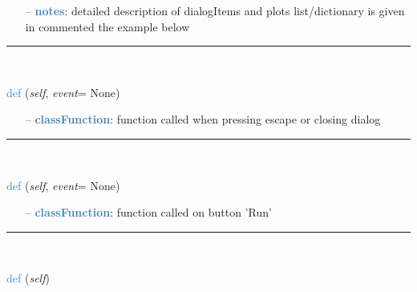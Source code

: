 \begin{itemize}[leftmargin=1.4cm]
\begin{itemize}[leftmargin=0.5cm]
\begin{itemize}[leftmargin=1.4cm]
\begin{itemize}[leftmargin=0.5cm]
\begin{itemize}[leftmargin=1.4cm]
\begin{itemize}[leftmargin=0.5cm]
\begin{itemize}[leftmargin=1.4cm]
\begin{itemize}[leftmargin=1.4cm]
\begin{itemize}[leftmargin=0.7cm]
\begin{itemize}[leftmargin=1.2cm]
  \end{itemize}
  \item[--]  \textcolor{steelblue}{\bf notes}: detailed description of dialogItems and plots list/dictionary is given in commented the example below\vspace{12pt}\end{itemize}
%
\noindent\rule{8cm}{0.75pt}\vspace{1pt} \\ 
\begin{flushleft}
\noindent \textcolor{steelblue}{def {\bf {}}}\label{sec:interactive:InteractiveDialog:OnQuit}
({\it self}, {\it event}= None)
\end{flushleft}
\setlength{\itemindent}{0.7cm}
\begin{itemize}[leftmargin=0.7cm]
  \item[--]  \textcolor{steelblue}{\bf classFunction}: function called when pressing escape or closing dialog\vspace{12pt}\end{itemize}
%
\noindent\rule{8cm}{0.75pt}\vspace{1pt} \\ 
\begin{flushleft}
\noindent \textcolor{steelblue}{def {\bf {}}}\label{sec:interactive:InteractiveDialog:StartSimulation}
({\it self}, {\it event}= None)
\end{flushleft}
\setlength{\itemindent}{0.7cm}
\begin{itemize}[leftmargin=0.7cm]
  \item[--]  \textcolor{steelblue}{\bf classFunction}: function called on button 'Run'\vspace{12pt}\end{itemize}
%
\noindent\rule{8cm}{0.75pt}\vspace{1pt} \\ 
\begin{flushleft}
\noindent \textcolor{steelblue}{def {\bf {}}}\label{sec:interactive:InteractiveDialog:ProcessWidgetStates}
({\it self})
\end{flushleft}
\setlength{\itemindent}{0.7cm}
\begin{itemize}[leftmargin=0.7cm]

\end{itemize}
\end{itemize}
\end{itemize}
\end{itemize}
\end{itemize}
\end{itemize}
\end{itemize}
\end{itemize}
\end{itemize}
